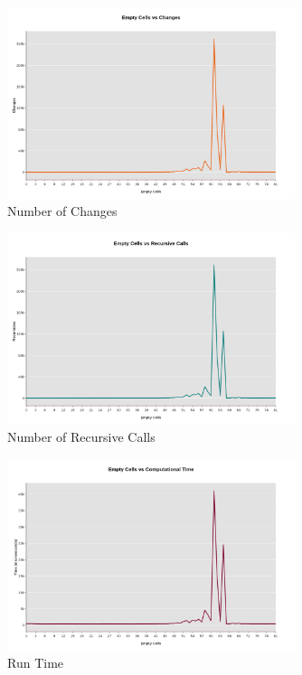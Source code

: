 \documentclass{article}
\begin{document}
        \begin{figure}[h]
        \centering
        \includegraphics[width=0.75\textwidth]{Changes.png}
        \caption{Number of Changes}
    \end{figure}
    
        \begin{figure}[h]
        \centering
        \includegraphics[width=0.75\textwidth]{Recursions.png}
        \caption{Number of Recursive Calls}
    \end{figure}
    
        \begin{figure}[h]
        \centering
        \includegraphics[width=0.75\textwidth]{Time.png}
        \caption{Run Time}
    \end{figure}
\end{document}
